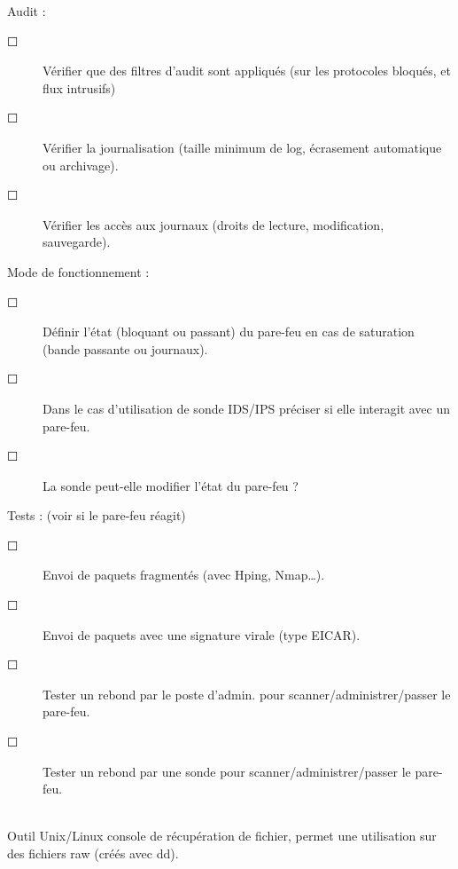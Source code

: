 \documentclass[a4paper,11pt]{article}				    %
\begin{document}
{\begin{LARGE}Audit : \end{LARGE}
\begin{description}
    \item[$\Square$] V\'erifier que des filtres d'audit sont appliqu\'es (sur les protocoles bloqu\'es, et flux intrusifs)
    \item[$\Square$] V\'erifier la journalisation (taille minimum de log, \'ecrasement automatique ou archivage).
    \item[$\Square$] V\'erifier les acc\`es aux journaux (droits de lecture, modification, sauvegarde).\\
\end{description}

\begin{LARGE}Mode de fonctionnement :\end{LARGE}
\begin{description}
    \item[$\Square$] D\'efinir l'\'etat (bloquant ou passant) du pare-feu en cas de saturation (bande passante ou journaux).
    \item[$\Square$] Dans le cas d'utilisation de sonde IDS/IPS pr\'eciser si elle interagit avec un pare-feu.
    \item[$\Square$] La sonde peut-elle modifier l'\'etat du pare-feu ?\\
\end{description}

\begin{LARGE}Tests : (voir si le pare-feu r\'eagit) \end{LARGE}
\begin{description}
    \item[$\Square$] Envoi de paquets fragment\'es (avec Hping, Nmap\dots{}).
    \item[$\Square$] Envoi de paquets avec une signature virale (type EICAR).
    \item[$\Square$] Tester un rebond par le poste d'admin. pour scanner/administrer/passer le pare-feu.
    \item[$\Square$] Tester un rebond par une sonde pour scanner/administrer/passer le pare-feu.
\end{description}
}
{
\\Outil Unix/Linux console de r\'ecup\'eration de fichier, permet une utilisation sur des fichiers raw (cr\'e\'es avec dd).
}
\end{document}
